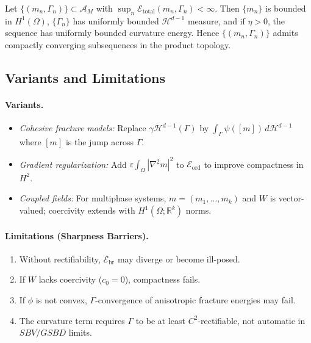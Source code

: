 \begin{proposition}\label{prop:equi-coercive}
Let $\{(m_n,\Gamma_n)\}\subset\mathcal{A}_M$ with $\sup_n\mathcal{E}_{\mathrm{total}}(m_n,\Gamma_n)<\infty$.  
Then $\{m_n\}$ is bounded in $H^1(\Omega)$, $\{\Gamma_n\}$ has uniformly bounded $\mathcal{H}^{d-1}$ measure, and if $\eta>0$, the sequence has uniformly bounded curvature energy. Hence $\{(m_n,\Gamma_n)\}$ admits compactly converging subsequences in the product topology.
\end{proposition}

\subsection{Variants and Limitations}
\paragraph{Variants.}
\begin{itemize}
  \item \emph{Cohesive fracture models:} Replace $\gamma\mathcal{H}^{d-1}(\Gamma)$ by $\int_{\Gamma} \psi([m])\,d\mathcal{H}^{d-1}$ where $[m]$ is the jump across $\Gamma$.
  \item \emph{Gradient regularization:} Add $\varepsilon\int_{\Omega} |\nabla^2 m|^2$ to $\mathcal{E}_{\mathrm{ord}}$ to improve compactness in $H^2$.
  \item \emph{Coupled fields:} For multiphase systems, $m=(m_1,\dots,m_k)$ and $W$ is vector-valued; coercivity extends with $H^1(\Omega;\mathbb{R}^k)$ norms.
\end{itemize}

\paragraph{Limitations (Sharpness Barriers).}
\begin{enumerate}
  \item Without rectifiability, $\mathcal{E}_{\mathrm{br}}$ may diverge or become ill-posed.
  \item If $W$ lacks coercivity ($c_0=0$), compactness fails.
  \item If $\phi$ is not convex, $\Gamma$-convergence of anisotropic fracture energies may fail.
  \item The curvature term requires $\Gamma$ to be at least $C^2$-rectifiable, not automatic in $SBV/GSBD$ limits.
\end{enumerate}

